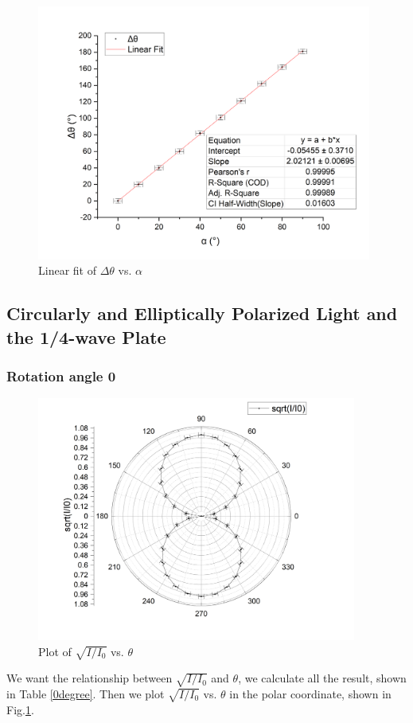 \documentclass[12pt,a4paper]{article}
\begin{document}
\begin{figure}[H]
    \centering
    \includegraphics[width=11cm]{change.png}
    \caption{Linear fit of $\Delta\theta$ vs. $\alpha$}
\end{figure}

\subsection{Circularly and Elliptically Polarized Light and the 1/4-wave Plate}
\subsubsection{Rotation angle 0\degree}
\begin{figure}[H]
    \centering
    \includegraphics[width=10.5cm]{0degree.png}
    \caption{Plot of $\sqrt{I/I_0}$ vs. $\theta$}
    \label{0degreefig}
\end{figure}
We want the relationship between $\sqrt{I/I_0}$ and $\theta$, we calculate all the result, shown in Table \ref{0degree}. Then we plot $\sqrt{I/I_0}$ vs. $\theta$ in the polar coordinate, shown in Fig.\ref{0degreefig}. 
\end{document}
